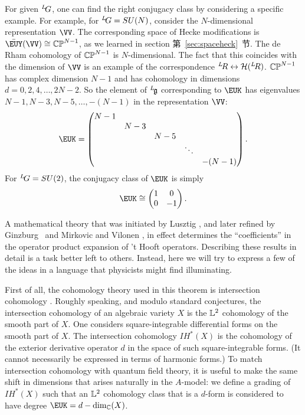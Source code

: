 For given $^L\negthinspace G$, one can find the right conjugacy
class by considering a specific example.  For example, for
$^L\negthinspace G=SU(N)$, consider the $N$-dimensional
representation $\VV$. The corresponding space of Hecke
modifications is $\bar {{\EUY}}(\VV)\cong \Bbb{CP}^{N-1}$, as we
learned in section 第~\ref{sec:spaceheck}~节. The de Rham cohomology of
$\Bbb{CP}^{N-1}$ is $N$-dimensional. The fact that this coincides
with the dimension of $\VV$ is an example of the correspondence
$^L\negthinspace R\leftrightarrow {\cal H}({}^L\negthinspace R)$.
$\Bbb{CP}^{N-1}$ has complex dimension $N-1$ and has cohomology in
dimensions $d=0,2,4,\dots,2N-2$. So the element of
$^L\negthinspace \frak{g}$ corresponding to ${\EUK}$  has
eigenvalues $N-1,N-3,N-5,\dots,-(N-1)$ in the representation
$\VV$: %
\setcounter{equation}{28}
\begin{equation}\label{eq:unosn}
\EUK=\left(\begin{matrix}N-1& &&& \\ & N-3 &&&\\ &&
N-5 &&\\ &&&\ddots & \\ &&&& -(N-1)\\\end{matrix}\right).
\end{equation}
 For
$^L\negthinspace G=SU(2)$, the conjugacy class of ${\EUK}$ is
simply %
\setcounter{equation}{29}
\begin{equation}\label{eq:mitlgo}
{\EUK}\cong\left(\begin{matrix}1 & 0 \\ 0 & -1
\\\end{matrix}\right).
\end{equation}

\par{}

 A mathematical theory that was initiated by Lusztig \cite{ref98}, and
 later refined by   Ginzburg \cite{ref96}\ and Mirkovic and
Vilonen \cite{ref97}, in effect determines the ``coefficients'' in
the operator product expansion of 't Hooft operators. Describing
these results in detail is a task better left to others. Instead,
here we will try to express a few of the ideas in a language that
physicists might find illuminating.

 First of all, the cohomology theory used in this theorem is intersection cohomology
\cite{ref128,ref129}.
 Roughly speaking,
and modulo standard conjectures, the intersection cohomology of an
algebraic variety $X$ is the ${\Bbb{L}}^2$ cohomology of the
smooth part of $X$.  One considers square-integrable differential
forms on the smooth part of $X$. The intersection cohomology
$IH^*(X)$ is the cohomology of the exterior derivative operator
$d$ in the space of such square-integrable forms.  (It cannot
necessarily be expressed in terms of harmonic forms.)  To match
intersection cohomology with quantum field theory, it is useful to
make the same shift in dimensions that arises naturally in the
$A$-model: we define a grading of $IH^*(X)$ such that an ${\Bbb{
L}}^2$ cohomology class that is a $d$-form is considered to have
degree $\EUK=d-{\rm dim}_{{\Bbb C}}(X)$.


